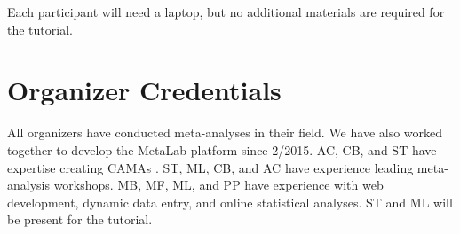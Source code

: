 \documentclass[10pt,letterpaper]{article}
\begin{document}
Each participant will need a laptop, but no additional materials are required for the tutorial.


\section{Organizer Credentials}
 All organizers have conducted meta-analyses in their field. We have also worked together to develop the MetaLab platform since 2/2015. AC, CB, and ST have expertise creating CAMAs \cite{tsuji2014community}. ST, ML, CB, and AC have experience leading meta-analysis workshops. MB, MF, ML, and PP have experience with web development, dynamic data entry, and online statistical analyses. ST and ML will be present for the tutorial. 




\setlength{\bibleftmargin}{.125in}
\setlength{\bibindent}{-\bibleftmargin}


\end{document}
